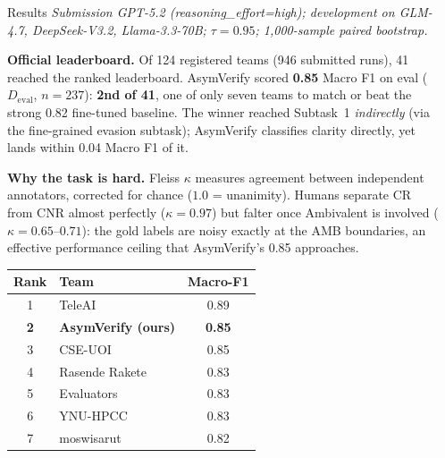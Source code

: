 \documentclass[final]{beamer}
\newlength{\sepwidth}\setlength{\sepwidth}{0.025\paperwidth}
\newlength{\halfW}\setlength{\halfW}{0.4625\paperwidth}
\newcommand{\separatorcolumn}{\begin{column}{\sepwidth}\end{column}}
\begin{document}
\begin{frame}[t]
\begin{columns}[t]
\separatorcolumn
\begin{column}{\halfW}
  \begin{block}{Results}
    {\itshape Submission GPT-5.2 (reasoning\_effort=high); development on GLM-4.7,
    DeepSeek-V3.2, Llama-3.3-70B; $\tau{=}0.95$; 1{,}000-sample paired bootstrap.}
    \par\medskip
    \begin{minipage}[t]{0.52\linewidth}
      \vspace{0pt}
      \textbf{Official leaderboard.} Of 124 registered teams (946 submitted runs), 41
      reached the ranked leaderboard. AsymVerify scored \textbf{0.85} Macro F1 on eval
      ($D_{\mathrm{eval}}$, $n{=}237$): \textbf{2nd of 41}, one of only seven teams to
      match or beat the strong 0.82 fine-tuned baseline. The winner reached Subtask~1
      \emph{indirectly} (via the fine-grained evasion subtask); AsymVerify classifies
      clarity directly, yet lands within 0.04 Macro F1 of it.
      \par\medskip
      \textbf{Why the task is hard.} Fleiss $\kappa$ measures agreement between
      independent annotators, corrected for chance ($1.0$ = unanimity). Humans separate
      CR from CNR almost perfectly ($\kappa{=}0.97$) but falter once Ambivalent is
      involved ($\kappa{=}0.65$--$0.71$): the gold labels are noisy exactly at the AMB
      boundaries, an effective performance ceiling that AsymVerify's 0.85 approaches.
    \end{minipage}\hfill
    \begin{minipage}[t]{0.44\linewidth}
      \vspace{0pt}\centering\fontsize{20}{23.5}\selectfont
      \begin{tabular}{@{}clc@{}}
        \toprule
        \textbf{Rank} & \textbf{Team} & \textbf{Macro-F1} \\
        \midrule
        1 & TeleAI & 0.89 \\
        \rowcolor{lavender}\textbf{2} & \textbf{AsymVerify (ours)} & \textbf{0.85} \\
        3 & CSE-UOI & 0.85 \\
        4 & Rasende Rakete & 0.83 \\
        5 & Evaluators & 0.83 \\
        6 & YNU-HPCC & 0.83 \\
        7 & moswisarut & 0.82 \\

\end{tabular}
\end{minipage}
\end{block}
\end{column}
\end{columns}
\end{frame}
\end{document}
